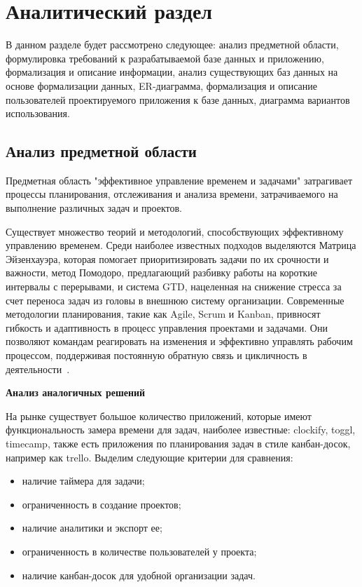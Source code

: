 \chapter{Аналитический раздел}

В данном разделе будет рассмотрено следующее: анализ предметной области, формулировка требований к разрабатываемой базе данных и приложению, формализация и описание информации, анализ существующих баз данных на основе формализации данных, ER-диаграмма, формализация и описание пользователей проектируемого приложения к базе данных, диаграмма вариантов использования.

\section{Анализ предметной области}

Предметная область "эффективное управление временем и задачами" затрагивает процессы планирования, отслеживания и анализа времени, затрачиваемого на выполнение различных задач и проектов. 

Существует множество теорий и методологий, способствующих эффективному управлению временем.
Среди наиболее известных подходов выделяются Матрица Эйзенхауэра, которая помогает приоритизировать задачи по их срочности и важности, метод Помодоро, предлагающий разбивку работы на короткие интервалы с перерывами, и система GTD, нацеленная на снижение стресса за счет переноса задач из головы в внешнюю систему организации.
Современные методологии планирования, такие как Agile, Scrum и Kanban, привносят гибкость и адаптивность в процесс управления проектами и задачами. Они позволяют командам реагировать на изменения и эффективно управлять рабочим процессом, поддерживая постоянную обратную связь и цикличность в деятельности~\cite{matrix, main-book}.

\textbf{Анализ аналогичных решений}

На рынке существует большое количество приложений, которые имеют функциональность замера времени для задач, наиболее известные: clockify, toggl, timecamp, также есть приложения по планирования задач в стиле канбан-досок, например как trello.
Выделим следующие критерии для сравнения:
\begin{itemize}
	\item наличие таймера для задачи;
	\item ограниченность в создание проектов;
	\item наличие аналитики и экспорт ее;
	\item ограниченность в количестве пользователей у проекта;
	\item наличие канбан-досок для удобной организации задач.
\end{itemize}

